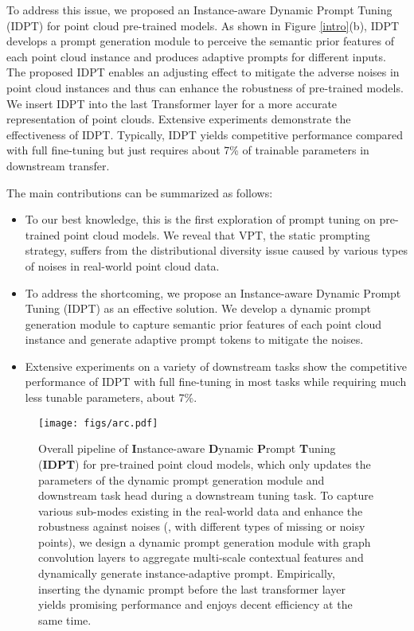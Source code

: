 \documentclass[10pt,twocolumn,letterpaper]{article}
\begin{document}
To address this issue, we proposed an Instance-aware Dynamic Prompt Tuning (IDPT) for point cloud pre-trained models. As shown in Figure \ref{intro}(b), IDPT develops a prompt generation module to perceive the semantic prior features of each point cloud instance and produces adaptive prompts for different inputs. 
The proposed IDPT enables an adjusting effect to mitigate the adverse noises in point cloud instances and thus can enhance the robustness of pre-trained models. 
We insert IDPT into the last Transformer layer for a more accurate representation of point clouds. 
Extensive experiments demonstrate the effectiveness of IDPT. 
Typically, IDPT yields competitive performance compared with full fine-tuning but just requires about 7\% of trainable parameters in downstream transfer.   

The main contributions can be summarized as follows:
\begin{itemize}
    \item  To our best knowledge, this is the first exploration of prompt tuning on pre-trained point cloud models. 
    We reveal that VPT, the static prompting strategy, suffers from the distributional diversity issue caused by various types of noises in real-world point cloud data. 
    \item To address the shortcoming, we propose an Instance-aware Dynamic Prompt Tuning (IDPT) as an effective solution. We develop a dynamic prompt generation module to capture semantic prior features of each point cloud instance and generate adaptive prompt tokens to mitigate the noises. 
    \item Extensive experiments on a variety of downstream tasks show the competitive performance of IDPT with full fine-tuning in most tasks while requiring much less tunable parameters, \eg about 7\%.
\end{itemize}

\begin{figure*}[t]
\centering
\texttt{[image: figs/arc.pdf]} 
\caption{Overall pipeline of \textbf{I}nstance-aware \textbf{D}ynamic \textbf{P}rompt \textbf{T}uning (\textbf{IDPT}) for pre-trained point cloud models, which only updates the parameters of the dynamic prompt generation module and downstream task head during a downstream tuning task. 
To capture various sub-modes existing in the real-world data and enhance the robustness against noises (\eg, with different types of missing or noisy points), we design a dynamic prompt generation module with graph convolution \cite{wang2019dynamic} layers to aggregate multi-scale contextual features and dynamically generate instance-adaptive prompt. 
Empirically, inserting the dynamic prompt before the last transformer layer yields promising performance and enjoys decent efficiency at the same time. 
}
\label{framework}
\end{figure*}
\end{document}
